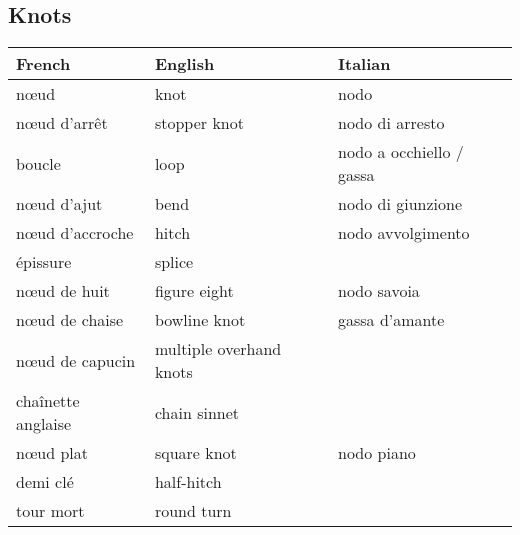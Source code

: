 \documentclass[a4paper, 12pt, twoside]{article}
\begin{document}
    \begin{indt}{\section{Knots}} %
        \begin{tabular}{|l|l|l|}
            \hline %
            \textbf{French}
            & \textbf{English}
            & \textbf{Italian}
            \\
            \hline
            \hline %
            n\oe ud %
            & knot
            & nodo
            \\
            \hline %
            n\oe ud d'arrêt %
            & stopper knot
            & nodo di arresto
            \\
            \hline %
            boucle %
            & loop
            & nodo a occhiello / gassa
            \\
            \hline %
            n\oe ud d'ajut %
            & bend
            & nodo di giunzione
            \\
            \hline %
            n\oe ud d'accroche %
            & hitch
            & nodo avvolgimento
            \\
            \hline %
            épissure %
            & splice
            &
            \\
            \hline %
            n\oe ud de huit %
            & figure eight
            & nodo savoia
            \\
            \hline %
            n\oe ud de chaise %
            & bowline knot
            & gassa d'amante
            \\
            \hline %
            n\oe ud de capucin %
            & multiple overhand knots
            &
            \\
            \hline %
            chaînette anglaise %
            & chain sinnet
            &
            \\
            \hline %
            n\oe ud plat %
            & square knot
            & nodo piano
            \\
            \hline %
            demi clé %
            & half-hitch
            &
            \\
            \hline %
            tour mort %
            & round turn
            &
            \\

\end{tabular}
\end{indt}
\end{document}
